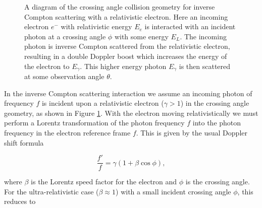 \documentclass[11pt]{article}
\begin{document}
\begin{figure}[H]
\centering
{}
\caption{\label{fig:angcomp} A diagram of the crossing angle collision geometry for inverse Compton scattering with a relativistic electron. Here an incoming electron $e^{-}$ with relativistic energy $E_{e}$ is interacted with an incident photon at a crossing angle $\phi$ with some energy $E_{L}$. The incoming photon is inverse Compton scattered from the relativistic electron, resulting in a double Doppler boost which increases the energy of the electron to $E_{\gamma}$. This higher energy photon $E_{\gamma}$ is then scattered at some observation angle $\theta$.}
\end{figure}

In the inverse Compton scattering interaction we assume an incoming photon of frequency $f$ is incident upon a relativistic electron ($\gamma > 1$) in the crossing angle geometry, as shown in Figure \ref{fig:angcomp}. With the electron moving relativistically we must perform a Lorentz transformation of the photon frequency $f$ into the photon frequency in the electron reference frame $f$. This is given by the usual Doppler shift formula

\begin{equation}
\frac{f'}{f} = \gamma\left(1+\beta\cos\phi\right),
\label{eq:1stdop}
\end{equation}

\noindent where $\beta$ is the Lorentz speed factor for the electron and $\phi$ is the crossing angle. For the ultra-relativistic case ($\beta \approx 1$) with a small incident crossing angle $\phi$, this reduces to
\end{document}
